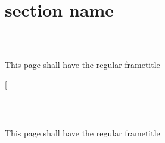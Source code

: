 \documentclass[aspectratio=169]{beamer}
\makeatletter
\def\tableofcontents{%
  \begin{frame}[special]
  \@ifnextchar[{\beamer@tableofcontents}{\beamer@tableofcontents[]}
  \end{frame}
}
\makeatother
\begin{document}
\section{section name}

\begin{frame}
\frametitle{~}
This page shall have the regular frametitle
\end{frame}

\tableofcontents

\begin{frame}
\frametitle{~}
This page shall have the regular frametitle
\end{frame}
\end{document}
